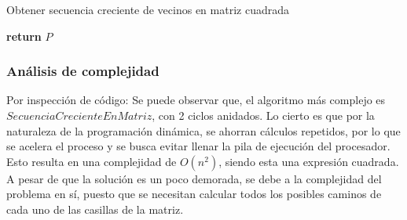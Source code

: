 \documentclass[letter]{article}
\begin{document}
\begin{algorithm}[!htb]
\caption{Obtener secuencia creciente de vecinos en matriz cuadrada}
\begin{algorithmic}[1]

    \EndFor
\EndFor


        \EndIf
    \EndFor
\EndFor



\EndWhile


\State \textbf{return} $P$

\EndProcedure
\end{algorithmic}
\end{algorithm}


\newpage

\subsubsection{Análisis de complejidad} \label{algoritmos:inocente:complejidad}

Por inspección de código: Se puede observar que, el algoritmo más complejo es \texttt{$SecuenciaCrecienteEnMatriz$}, con 2 ciclos anidados. Lo cierto es que por la naturaleza de la programación dinámica, se ahorran cálculos repetidos, por lo que se acelera el proceso y se busca evitar llenar la pila de ejecución del procesador. Esto resulta en una complejidad de $O(n^2)$, siendo esta una expresión cuadrada. A pesar de que la solución es un poco demorada, se debe a la complejidad del problema en sí, puesto que se necesitan calcular todos los posibles caminos de cada uno de las casillas de la matriz.
\end{document}
